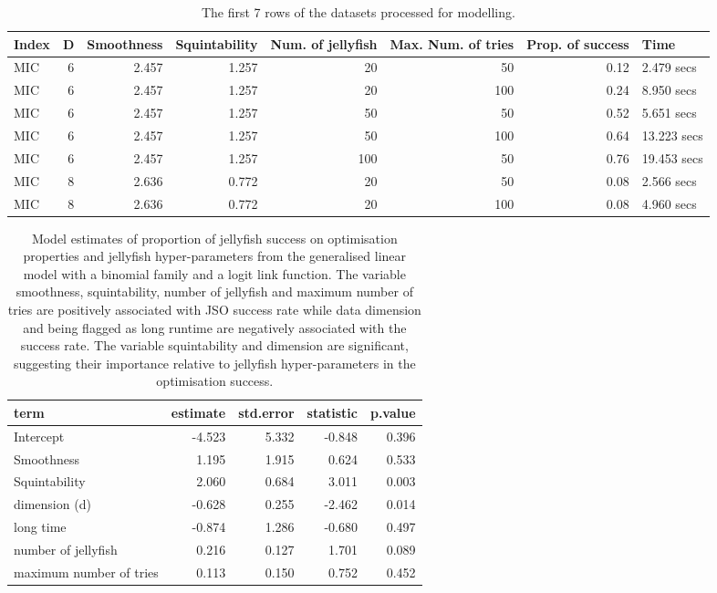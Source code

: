 \documentclass[
  number,
  preprint,
  3p]{elsarticle}
\begin{document}
\begingroup\fontsize{7}{9}\selectfont

\begin{longtable}[t]{lrrrrrrl}

\caption{\label{tbl-mod-data}The first 7 rows of the datasets processed
for modelling.}

\tabularnewline

\toprule
Index & D & Smoothness & Squintability & Num. of jellyfish & Max. Num. of tries & Prop. of success & Time\\
\midrule
MIC & 6 & 2.457 & 1.257 & 20 & 50 & 0.12 & 2.479 secs\\
MIC & 6 & 2.457 & 1.257 & 20 & 100 & 0.24 & 8.950 secs\\
MIC & 6 & 2.457 & 1.257 & 50 & 50 & 0.52 & 5.651 secs\\
MIC & 6 & 2.457 & 1.257 & 50 & 100 & 0.64 & 13.223 secs\\
MIC & 6 & 2.457 & 1.257 & 100 & 50 & 0.76 & 19.453 secs\\
\addlinespace
MIC & 8 & 2.636 & 0.772 & 20 & 50 & 0.08 & 2.566 secs\\
MIC & 8 & 2.636 & 0.772 & 20 & 100 & 0.08 & 4.960 secs\\
\bottomrule

\end{longtable}

\endgroup{}

\begingroup\fontsize{7}{9}\selectfont

\begin{longtable}[t]{|>{}lrrr>{}r|}

\caption{\label{tbl-mod-output}Model estimates of proportion of
jellyfish success on optimisation properties and jellyfish
hyper-parameters from the generalised linear model with a binomial
family and a logit link function. The variable smoothness,
squintability, number of jellyfish and maximum number of tries are
positively associated with JSO success rate while data dimension and
being flagged as long runtime are negatively associated with the success
rate. The variable squintability and dimension are significant,
suggesting their importance relative to jellyfish hyper-parameters in
the optimisation success.}

\tabularnewline

\toprule
term & estimate & std.error & statistic & p.value\\
\midrule
Intercept & -4.523 & 5.332 & -0.848 & 0.396\\
Smoothness & 1.195 & 1.915 & 0.624 & 0.533\\
Squintability & 2.060 & 0.684 & 3.011 & 0.003\\
dimension (d) & -0.628 & 0.255 & -2.462 & 0.014\\
long time & -0.874 & 1.286 & -0.680 & 0.497\\
\addlinespace
number of jellyfish & 0.216 & 0.127 & 1.701 & 0.089\\
maximum number of tries & 0.113 & 0.150 & 0.752 & 0.452\\
\bottomrule

\end{longtable}
\end{document}
